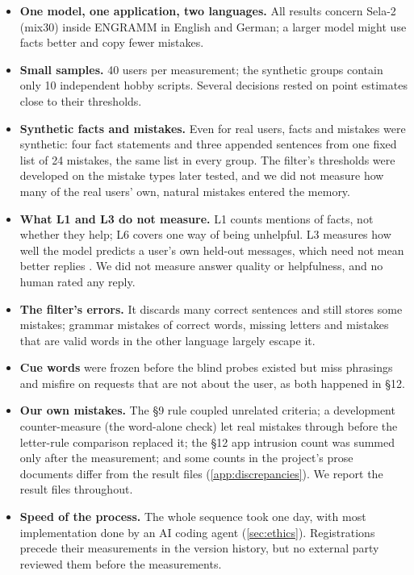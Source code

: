\documentclass[10pt,twocolumn]{article}
\begin{document}
\begin{itemize}
\item \textbf{One model, one application, two languages.} All results concern Sela-2 (mix30) inside ENGRAMM in English
and German; a larger model might use facts better and copy fewer mistakes.
\item \textbf{Small samples.} 40 users per measurement; the synthetic groups contain only 10 independent hobby scripts.
Several decisions rested on point estimates close to their thresholds.
\item \textbf{Synthetic facts and mistakes.} Even for real users, facts and mistakes were synthetic: four fact statements
and three appended sentences from one fixed list of 24 mistakes, the same list in every group. The filter's thresholds
were developed on the mistake types later tested, and we did not measure how many of the real users' own, natural
mistakes entered the memory.
\item \textbf{What L1 and L3 do not measure.} L1 counts mentions of facts, not whether they help; L6 covers one way of being
unhelpful. L3 measures how well the model predicts a user's own held-out messages, which need not mean better replies
\citep{wang2023knnlm}. We did not measure answer quality or helpfulness, and no human rated any reply.
\item \textbf{The filter's errors.} It discards many correct sentences and still stores some mistakes; grammar mistakes of
correct words, missing letters and mistakes that are valid words in the other language largely escape it.
\item \textbf{Cue words} were frozen before the blind probes existed but miss phrasings and misfire on requests that are
not about the user, as both happened in \S12.
\item \textbf{Our own mistakes.} The \S9 rule coupled unrelated criteria; a development counter-measure (the word-alone
check) let real mistakes through before the letter-rule comparison replaced it; the \S12 app intrusion count was summed
only after the measurement; and some counts in the project's prose documents differ from the result files
(\cref{app:discrepancies}). We report the result files throughout.
\item \textbf{Speed of the process.} The whole sequence took one day, with most implementation done by an AI coding agent
(\cref{sec:ethics}). Registrations precede their measurements in the version history, but no external party reviewed
them before the measurements.
\end{itemize}
\end{document}
